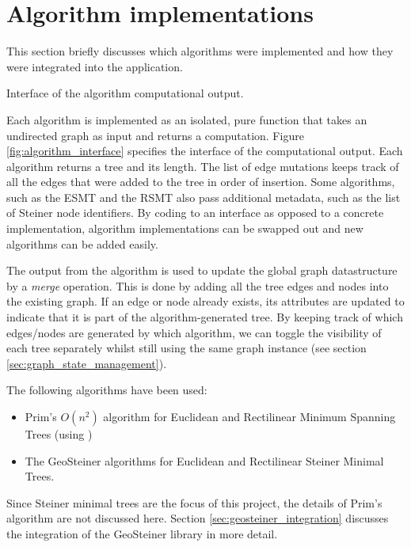 \documentclass{l4proj}
\begin{document}
\section{Algorithm implementations}
This section briefly discusses which algorithms were implemented and how they were integrated into the application.
\begin{wrapstuff}[r,width=0.3\textwidth,type=figure]
    \centering
    \caption{Interface of the algorithm computational output.}
    
    \label{fig:algorithm_interface}
\end{wrapstuff}
Each algorithm is implemented as an isolated, pure function that takes an undirected graph as input and returns a computation.
Figure \ref{fig:algorithm_interface} specifies the interface of the computational output. Each algorithm returns a tree and its length. The list of edge mutations keeps track of all the edges that were added to the tree in order of insertion. Some algorithms, such as the ESMT and the RSMT also pass additional metadata, such as the list of Steiner node identifiers.
By coding to an interface as opposed to a concrete implementation, algorithm implementations can be swapped out and new algorithms can be added easily.

The output from the algorithm is used to update the global graph datastructure by a \textit{merge} operation. This is done by adding all the tree edges and nodes into the existing graph. If an edge or node already exists, its attributes are updated to indicate that it is part of the algorithm-generated tree. By keeping track of which edges/nodes are generated by which algorithm, we can toggle the visibility of each tree separately whilst still using the same graph instance (see section \ref{sec:graph_state_management}).

\wrapstuffclear

The following algorithms have been used:
\begin{itemize}
    \item Prim's $O(n^2)$ algorithm for Euclidean and Rectilinear Minimum Spanning Trees (using \citep[pp. 194--195]{Skiena2008})
    \item The GeoSteiner algorithms for Euclidean and Rectilinear Steiner Minimal Trees.
\end{itemize}

Since Steiner minimal trees are the focus of this project, the details of Prim's algorithm are not discussed here. Section \ref{sec:geosteiner_integration} discusses the integration of the GeoSteiner library in more detail.
\end{document}
